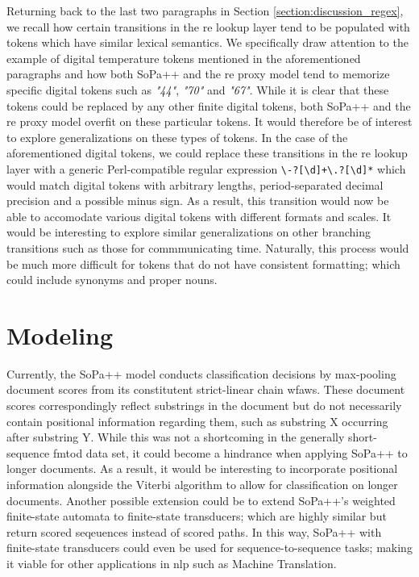 Returning back to the last two paragraphs in Section
\ref{section:discussion_regex}, we recall how certain transitions in the \ac{re}
lookup layer tend to be populated with tokens which have similar lexical
semantics. We specifically draw attention to the example of digital temperature
tokens mentioned in the aforementioned paragraphs and how both SoPa++ and the \ac{re}
proxy model tend to memorize specific digital tokens such as \textit{"44"},
\textit{"70"} and \textit{"67"}. While it is clear that these tokens could be
replaced by any other finite digital tokens, both SoPa++ and the \ac{re} proxy model
overfit on these particular tokens. It would therefore be of interest to explore
generalizations on these types of tokens. In the case of the aforementioned
digital tokens, we could replace these transitions in the \ac{re} lookup layer with a
generic Perl-compatible regular expression
\texttt{\textbackslash-?[\textbackslash d]+\textbackslash .?[\textbackslash d]*}
which would match digital tokens with arbitrary lengths, period-separated
decimal precision and a possible minus sign. As a result, this transition would
now be able to accomodate various digital tokens with different formats and
scales. It would be interesting to explore similar generalizations on other
branching transitions such as those for commmunicating time. Naturally, this
process would be much more difficult for tokens that do not have consistent
formatting; which could include synonyms and proper nouns.

\section{Modeling}

Currently, the SoPa++ model conducts classification decisions by max-pooling
document scores from its constitutent strict-linear chain \ac{wfaws}. These
document scores correspondingly reflect substrings in the document but do not
necessarily contain positional information regarding them, such as substring
X occurring after substring Y. While this was not a shortcoming in the generally
short-sequence \ac{fmtod} data set, it could become a hindrance when applying SoPa++
to longer documents. As a result, it would be interesting to incorporate
positional information alongside the Viterbi algorithm to allow for
classification on longer documents. Another possible extension could be to
extend SoPa++'s weighted finite-state automata to finite-state transducers;
which are highly similar but return scored seqeuences instead of scored paths.
In this way, SoPa++ with finite-state transducers could even be used for
sequence-to-sequence tasks; making it viable for other applications in \ac{nlp} such
as Machine Translation.


